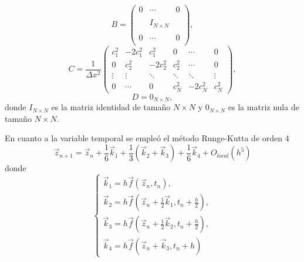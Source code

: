 \documentclass[aps,prb,twocolumn,superscriptaddress,floatfix,longbibliography,10pt]{revtex4-2}
\begin{document}
\[B = \begin{pmatrix}
  0 & \cdots & 0 \\ \\
  & I_{N \times N} & \\ \\
  0 & \cdots & 0 \\
  \end{pmatrix},
   \]
\[ C = \frac{1}{\Delta x^2} \begin{pmatrix}
  c_1^2 & -2 c_1^2 & c_1^2 & 0 & \cdots & 0 \\
  0 & c_2^2 & - 2 c_2^2 & c_2^2 & \cdots & 0 \\
  \vdots & \vdots & \ddots & \ddots & \ddots & \vdots \\
  0 & \cdots & 0 & c_N^2 & - 2 c_N^2 & c_N^2
  \end{pmatrix}, \]
\[ D =  0_{N \times N}, \]
donde $I_{N \times N}$ es la matriz identidad de tamaño $N \times N$ y $0_{N \times N}$ es la matriz nula de tamaño $N \times N$. 

En cuanto a la variable temporal se empleó el método Runge-Kutta de orden 4
\begin{equation}
  \vec{z}_{n+1} = \vec{z}_n + \frac{1}{6} \vec{k}_1 + \frac{1}{3} (\vec{k}_2 + \vec{k}_3) + \frac{1}{6} \vec{k}_4 + O_{local}(h^5)
  \label{eq:Runge_Kutta_4}
\end{equation}
donde
\[
  \left\{\begin{matrix}
    \vec{k}_1 = h \vec{f}(\vec{z}_n, t_n), \\ 
    \vec{k}_2 = h \vec{f} \left( \vec{z}_n + \frac{1}{2} \vec{k}_1 , t_n + \frac{h}{2}\right), \\
    \vec{k}_3 = h \vec{f} \left ( \vec{z}_n + \frac{1}{2} \vec{k}_2 , t_n + \frac{h}{2}  \right ), \\
    \vec{k}_4 = h \vec{f}(\vec{z}_n + \vec{k}_3, t_n + h)
  \end{matrix}\right.
\]
\end{document}
